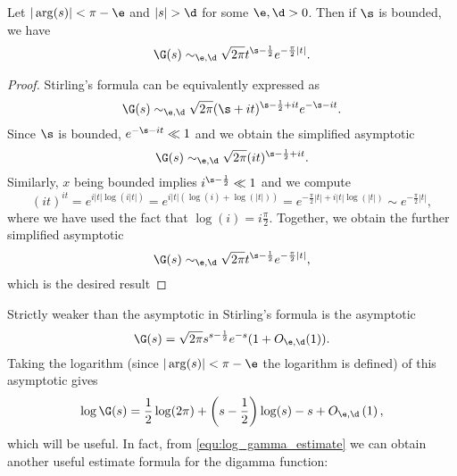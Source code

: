     \begin{corollary}\label{equ:weaker_Stirling_formula}
    Let $|\arg(s)| < \pi-\e$ and $|s| > \d$ for some $\e,\d > 0$. Then if $\s$ is bounded, we have
      \[
        \G(s) \sim_{\e,\d} \sqrt{2\pi}t^{\s-\frac{1}{2}}e^{-\frac{\pi}{2}|t|}.
      \]
    \end{corollary}
    \begin{proof}
      Stirling's formula can be equivalently expressed as
      \[
        \G(s) \sim_{\e,\d} \sqrt{2\pi}(\s+it)^{\s-\frac{1}{2}+it}e^{-\s-it}.
      \]
      Since $\s$ is bounded, $e^{-\s-it} \ll 1$ and we obtain the simplified asymptotic
      \[
        \G(s) \sim_{\e,\d} \sqrt{2\pi}(it)^{\s-\frac{1}{2}+it}.
      \]
      Similarly, $x$ being bounded implies $i^{\s-\frac{1}{2}} \ll 1$ and we compute
      \[
        (it)^{it} = e^{i|t|\log(i|t|)} = e^{i|t|(\log(i)+\log(|t|))} = e^{-\frac{\pi}{2}|t|+i|t|\log(|t|)} \sim e^{-\frac{\pi}{2}|t|},
      \]
      where we have used the fact that $\log(i) = i\frac{\pi}{2}$. Together, we obtain the further simplified asymptotic
      \[
        \G(s) \sim_{\e,\d} \sqrt{2\pi}t^{\s-\frac{1}{2}}e^{-\frac{\pi}{2}|t|},
      \]
      which is the desired result
    \end{proof}
    Strictly weaker than the asymptotic in Stirling's formula is the asymptotic
    \begin{equation}
        \G(s) = \sqrt{2\pi}s^{s-\frac{1}{2}}e^{-s}(1+O_{\e,\d}(1)).
    \end{equation}
    Taking the logarithm (since $|\arg(s)| < \pi-\e$ the logarithm is defined) of this asymptotic gives
    \begin{equation}\label{equ:log_gamma_estimate}
      \log\G(s) = \frac{1}{2}\log(2\pi)+\left(s-\frac{1}{2}\right)\log(s)-s+O_{\e,\d}\left(1\right),
    \end{equation}
    which will be useful. In fact, from \cref{equ:log_gamma_estimate} we can obtain another useful estimate formula for the digamma function:

